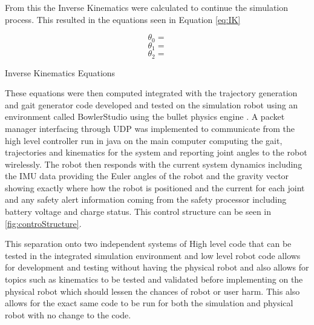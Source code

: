 \documentclass[conference]{IEEEtran}
\begin{document}
    From this the Inverse Kinematics were calculated to continue the simulation process. This resulted in the equations seen in Equation \ref{eq:IK} 
    
    \begin{eqfloat}[H]
    \setcounter{equation}{0}

    \begin{equation}
        \theta_0 = 
        \label{IK:q1}
    \end{equation}
    \begin{equation}
        \theta_1 = 
        \label{IK:q2}
    \end{equation}
    \begin{equation}
        \theta_2 = 
        \label{IK:q3}
    \end{equation}
    \setcounter{equation}{2}
    \caption{\label{eq:IK}Inverse Kinematics Equations}
    \end{eqfloat}
    
    These equations were then computed integrated with the trajectory generation and gait generator code developed and tested on the simulation robot using an environment called BowlerStudio\cite{BowlerStudio} using the bullet physics engine \cite{Coumans:2015:BPS:2776880.2792704}. A packet manager interfacing through UDP was implemented to communicate from the high level controller run in java on the main computer computing the gait, trajectories and kinematics for the system and reporting joint angles to the robot wirelessly. The robot then responds with the current system dynamics including the IMU data providing the Euler angles of the robot and the gravity vector showing exactly where how the robot is positioned and the current for each joint and any safety alert information coming from the safety processor including battery voltage and charge status. This control structure can be seen in \ref{fig:controStructure}.
    
    This separation onto two independent systems of High level code that can be tested in the integrated simulation environment and low level robot code allows for development and testing without having the physical robot and also allows for topics such as kinematics to be tested and validated before implementing on the physical robot which should lessen the chances of robot or user harm. This also allows for the exact same code to be run for both the simulation and physical robot with no change to the code.
    
\end{document}
